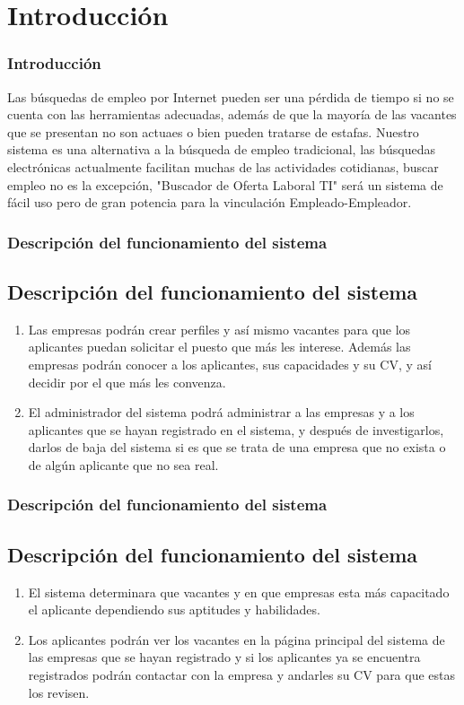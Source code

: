 \section{Introducción}
\frame
{
  \frametitle{Introducción} 
 Las búsquedas de empleo por Internet pueden ser una pérdida de tiempo si no se cuenta con las herramientas adecuadas, además de que la mayoría de las vacantes que se presentan no son actuaes o bien pueden tratarse de estafas.
\newline
Nuestro sistema es una alternativa a la búsqueda de empleo tradicional, las búsquedas electrónicas actualmente facilitan muchas de  las actividades cotidianas, buscar empleo no es la excepción,  "Buscador de Oferta Laboral TI"  será un sistema de  fácil uso pero de gran potencia para la vinculación Empleado-Empleador. 
}
\frame
{
\frametitle{Descripci\'on del funcionamiento del sistema}
	
	\subsection{Descripción del funcionamiento del sistema}

\begin{enumerate}
	\item Las empresas podrán crear perfiles y así mismo vacantes para que los aplicantes puedan solicitar el puesto que más les interese. Además las empresas podrán conocer a los aplicantes, sus capacidades y su CV, y así decidir por el que más les convenza. 
	\item El administrador del sistema podrá administrar a las empresas y a los aplicantes que se hayan registrado en el sistema, y después de investigarlos, darlos de baja del sistema si es que se trata de una empresa que no exista o de algún aplicante que no sea real. 
\end{enumerate}

}

\frame
{
\frametitle{Descripci\'on del funcionamiento del sistema}
	\subsection{Descripción del funcionamiento del sistema}

\begin{enumerate}
	

	\item El sistema determinara que vacantes y en que empresas esta más capacitado el aplicante dependiendo sus aptitudes y habilidades.
	\item Los aplicantes podrán ver los vacantes en la página principal del sistema de las empresas que se hayan registrado y si los aplicantes ya se encuentra registrados podrán contactar con la empresa y andarles su CV para que estas los revisen. 
\end{enumerate}

}

